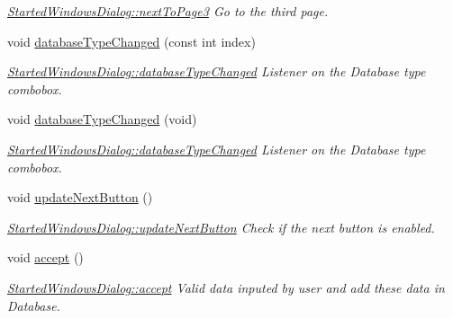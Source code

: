 \begin{DoxyCompactItemize}
\begin{DoxyCompactList}\small\item\em \hyperlink{classGui_1_1Dialogs_1_1StartedWindowsDialog_abac16c4f9fc0a3481565530fa01d8494}{Started\+Windows\+Dialog\+::next\+To\+Page3} Go to the third page. \end{DoxyCompactList}\item 
void \hyperlink{classGui_1_1Dialogs_1_1StartedWindowsDialog_a2e11f7b179785e86a86294d2d2d5357f}{database\+Type\+Changed} (const int index)
\begin{DoxyCompactList}\small\item\em \hyperlink{classGui_1_1Dialogs_1_1StartedWindowsDialog_a2e11f7b179785e86a86294d2d2d5357f}{Started\+Windows\+Dialog\+::database\+Type\+Changed} Listener on the Database type combobox. \end{DoxyCompactList}\item 
\hypertarget{classGui_1_1Dialogs_1_1StartedWindowsDialog_a16430b61886e3139fa275419ec3024b6}{}void \hyperlink{classGui_1_1Dialogs_1_1StartedWindowsDialog_a16430b61886e3139fa275419ec3024b6}{database\+Type\+Changed} (void)\label{classGui_1_1Dialogs_1_1StartedWindowsDialog_a16430b61886e3139fa275419ec3024b6}

\begin{DoxyCompactList}\small\item\em \hyperlink{classGui_1_1Dialogs_1_1StartedWindowsDialog_a2e11f7b179785e86a86294d2d2d5357f}{Started\+Windows\+Dialog\+::database\+Type\+Changed} Listener on the Database type combobox. \end{DoxyCompactList}\item 
\hypertarget{classGui_1_1Dialogs_1_1StartedWindowsDialog_aedfea7b7d80e1877e50647fae5bdc052}{}void \hyperlink{classGui_1_1Dialogs_1_1StartedWindowsDialog_aedfea7b7d80e1877e50647fae5bdc052}{update\+Next\+Button} ()\label{classGui_1_1Dialogs_1_1StartedWindowsDialog_aedfea7b7d80e1877e50647fae5bdc052}

\begin{DoxyCompactList}\small\item\em \hyperlink{classGui_1_1Dialogs_1_1StartedWindowsDialog_aedfea7b7d80e1877e50647fae5bdc052}{Started\+Windows\+Dialog\+::update\+Next\+Button} Check if the next button is enabled. \end{DoxyCompactList}\item 
\hypertarget{classGui_1_1Dialogs_1_1StartedWindowsDialog_aa5da70f656530017906b5aa974fbc080}{}void \hyperlink{classGui_1_1Dialogs_1_1StartedWindowsDialog_aa5da70f656530017906b5aa974fbc080}{accept} ()\label{classGui_1_1Dialogs_1_1StartedWindowsDialog_aa5da70f656530017906b5aa974fbc080}

\begin{DoxyCompactList}\small\item\em \hyperlink{classGui_1_1Dialogs_1_1StartedWindowsDialog_aa5da70f656530017906b5aa974fbc080}{Started\+Windows\+Dialog\+::accept} Valid data inputed by user and add these data in Database. \end{DoxyCompactList}\end{DoxyCompactItemize}
